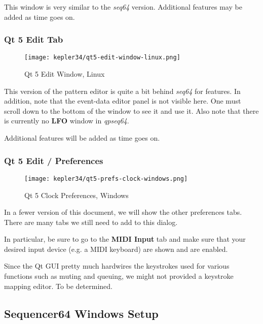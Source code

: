    This window is very similar to the \textsl{seq64} version.
   Additional features may be added as time goes on.

\subsubsection{Qt 5 Edit Tab}
\label{subsubsec:qt_portmidi_qt5_edit_tab}

\begin{figure}[H]
   \centering 
   \texttt{[image: kepler34/qt5-edit-window-linux.png]}
   \caption{Qt 5 Edit Window, Linux}
   \label{fig:qt5_edit_window_linux}
\end{figure}

   This version of the pattern editor is quite a bit behind
   \textsl{seq64} for features.
   In addition, note that the event-data editor panel is not visible here.
   One must scroll down to the bottom of the window to see it and use it.
   Also note that there is currently no \textbf{LFO} window in
   \textsl{qpseq64}.
   
   Additional features will be added as time goes on.

\subsubsection{Qt 5 Edit / Preferences}
\label{subsubsec:qt_portmidi_qt5_edit_prefs}

\begin{figure}[H]
   \centering 
   \texttt{[image: kepler34/qt5-prefs-clock-windows.png]}
   \caption{Qt 5 Clock Preferences, Windows}
   \label{fig:qt5_prefs_clock_windows}
\end{figure}

   In a fewer version of this document, we will show the other preferences
   tabs.  There are many tabs we still need to add to this dialog.

   In particular, be sure to go to the \textbf{MIDI Input} tab and
   make sure that your desired input device (e.g. a MIDI keyboard) are shown
   and are enabled.

   Since the Qt GUI pretty much hardwires the keystrokes used for various
   functions such as muting and queuing, we might not provided a keystroke
   mapping editor.  To be determined.

\subsection{Sequencer64 Windows Setup}
\label{subsec:qt_portmidi_windows_setup}

